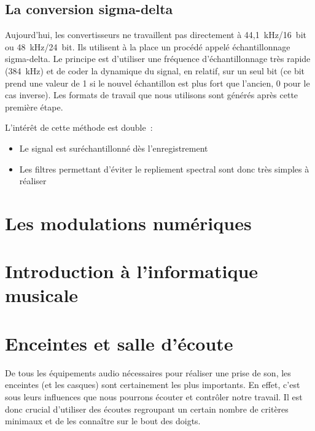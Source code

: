 \documentclass[
]{book}
\providecommand{\tightlist}{%
  \setlength{\itemsep}{0pt}\setlength{\parskip}{0pt}}
\begin{document}
\hypertarget{la-conversion-sigma-delta}{%
\section{La conversion sigma-delta}\label{la-conversion-sigma-delta}}

Aujourd'hui, les convertisseurs ne travaillent pas directement à 44,1~kHz/16~bit ou 48~kHz/24~bit. Ils utilisent à la place un procédé appelé échantillonnage sigma-delta. Le principe est d'utiliser une fréquence d'échantillonnage très rapide (384~kHz) et de coder la dynamique du signal, en relatif, sur un seul bit (ce bit prend une valeur de 1 si le nouvel échantillon est plus fort que l'ancien, 0 pour le cas inverse). Les formats de travail que nous utilisons sont générés après cette première étape.

L'intérêt de cette méthode est double~:

\begin{itemize}
\tightlist
\item
  Le signal est suréchantillonné dès l'enregistrement
\item
  Les filtres permettant d'éviter le repliement spectral sont donc très simples à réaliser
\end{itemize}

\hypertarget{les-modulations-numuxe9riques}{%
\chapter{Les modulations numériques}\label{les-modulations-numuxe9riques}}

\hypertarget{introduction-uxe0-linformatique-musicale}{%
\chapter{Introduction à l'informatique musicale}\label{introduction-uxe0-linformatique-musicale}}

\hypertarget{enceintes-et-salle-duxe9coute}{%
\chapter{Enceintes et salle d'écoute}\label{enceintes-et-salle-duxe9coute}}

De tous les équipements audio nécessaires pour réaliser une prise de son, les enceintes (et les casques) sont certainement les plus importants. En effet, c'est sous leurs influences que nous pourrons écouter et contrôler notre travail. Il est donc crucial d'utiliser des écoutes regroupant un certain nombre de critères minimaux et de les connaître sur le bout des doigts.
\end{document}
